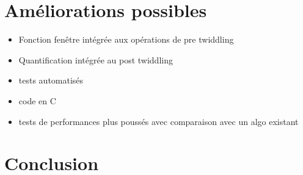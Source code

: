\documentclass{article}
\begin{document}
    \section{Améliorations possibles}
    \label{sec:ameliorations}
    \begin{itemize}
        \item Fonction fenêtre intégrée aux opérations de pre twiddling
        \item Quantification intégrée au post twiddling
        \item tests automatisés
        \item code en C
        \item tests de performances plus poussés avec comparaison avec un algo existant
    \end{itemize}




    \newpage
    \section*{Conclusion}
\end{document}
